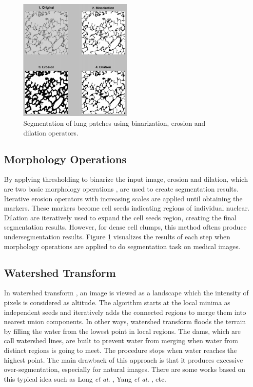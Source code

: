 \begin{figure}[thb]
    \centering
    \includegraphics[width=0.5\textwidth]{resources/2_morphological_seg.png}
    \caption{Segmentation of lung patches using binarization, erosion and dilation operators. \cite{morphological_seg}}
    \label{fig:morphological_seg}
\end{figure}

\subsection{Morphology Operations}
By applying thresholding to binarize the input image, erosion and dilation, which are two basic morphology operations \cite{morphology1}, are used to create segmentation results. Iterative erosion operators with increasing scales are applied until obtaining the markers. These markers become cell seeds indicating regions of individual nuclear. Dilation are iteratively used to expand the cell seeds region, creating the final segmentation results. However, for dense cell clumps, this method oftens produce undersegmentation results. Figure \ref{fig:morphological_seg} visualizes the results of each step when morphology operations are applied to do segmentation task on medical images. 

\subsection{Watershed Transform}
In watershed transform \cite{watershed}, an image is viewed as a landscape which the intensity of pixels is considered as altitude. The algorithm starts at the local minima as independent seeds and iteratively adds the connected regions to merge them into nearest union components. In other ways, watershed transform floods the terrain by filling the water from the lowest point in local regions. The dams, which are call watershed lines, are built to prevent water from merging when water from distinct regions is going to meet. The procedure stops when  water reaches the highest point. The main drawback of this approach is that it produces excessive over-segmentation, especially for natural images. There are some works based on this typical idea such as Long \textit{et al.} \cite{long_watershed}, Yang \textit{et al.} \cite{yang_watershed}, etc.


